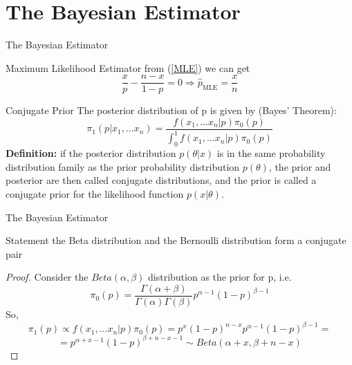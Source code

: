 \documentclass{beamer}
\begin{document}
\section{The Bayesian Estimator}
\begin{frame}{The Bayesian Estimator}
    \begin{block}{Maximum Likelihood Estimator}
        from (\ref{MLE}) we can get
        \begin{equation}
            \dfrac{x}{p} - \dfrac{n-x}{1-p} = 0 \Rightarrow \hat{p}_{\text{MLE}} = \dfrac{x}{n}
        \end{equation}
    \end{block}
    
    \begin{block}{Conjugate Prior}
        The posterior distribution of p is given by (Bayes’ Theorem):
        \[\pi_1(p | x_1, \ldots x_n) = \dfrac{f(x_1, \ldots x_n | p)\pi_0(p)}{\int_{0}^1 f(x_1, \ldots x_n | p)\pi_0(p)}\]
        \textbf{Definition:} if the posterior distribution $p(\theta | x)$ is in the same probability distribution family as the prior probability distribution $p(\theta)$, the prior and posterior are then called conjugate distributions, and the prior is called a conjugate prior for the likelihood function $p(x | \theta)$.
    \end{block}
\end{frame}

\begin{frame}{The Bayesian Estimator}
    \begin{block}{Statement}
        the Beta distribution and the Bernoulli distribution form a conjugate pair
    \end{block}
    \begin{proof}
        Consider the $Beta(\alpha, \beta)$ distribution as the prior for p, i.e.
        \[\pi_0(p) = \dfrac{\Gamma(\alpha + \beta)}{\Gamma(\alpha)\Gamma(\beta)}p^{\alpha-1}(1 - p)^{\beta - 1}\]
        So, 
        \[\pi_1(p) \propto f(x_1, \ldots x_n | p)\pi_0(p) = p^x(1 - p)^{n - x}p^{\alpha-1}(1 - p)^{\beta - 1} = \]
        \[ = p^{\alpha + x - 1}(1 - p)^{\beta + n - x - 1} \sim Beta(\alpha + x, \beta + n - x)\]
    \end{proof}
\end{frame}
\end{document}
